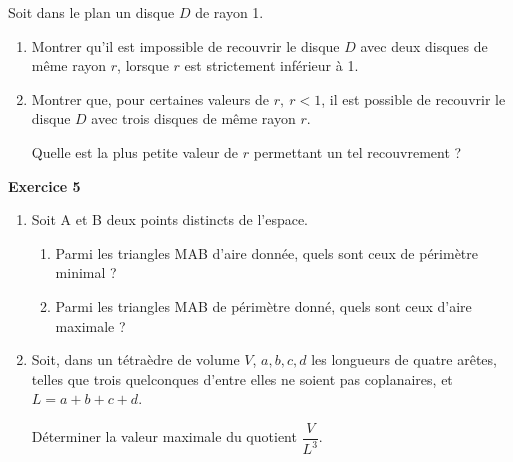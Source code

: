 \documentclass[a4paper,11pt]{article}
\begin{document}
Soit dans le plan un disque $D$ de rayon 1.

\medskip

\begin{enumerate}
\item Montrer qu'il est impossible de recouvrir le disque $D$ avec deux disques de même
rayon $r$, lorsque $r$ est strictement inférieur à 1.
\item Montrer que, pour certaines valeurs de $r,\: r < 1$, il est possible de recouvrir le disque $D$ avec trois disques de même rayon $r$. 

Quelle est la plus petite valeur de $r$ permettant un tel recouvrement ?
\end{enumerate}

\begin{center}\textbf{{\color{blue} Exercice 5}}
\end{center}

\begin{enumerate}
\item Soit A et B deux points distincts de l'espace.
	\begin{enumerate}
		\item Parmi les triangles MAB d'aire donnée, quels sont ceux de périmètre minimal ?
		\item Parmi les triangles MAB de périmètre donné, quels sont ceux d'aire maximale ?
	\end{enumerate}	
\item Soit, dans un tétraèdre de volume $V$,\: $a, b, c, d$ les longueurs de quatre arêtes, telles que trois quelconques d'entre elles ne soient pas coplanaires, et $L = a + b + c + d$.

Déterminer la valeur maximale du quotient $\dfrac{V}{L^3}$.
\end{enumerate}
\end{document}

